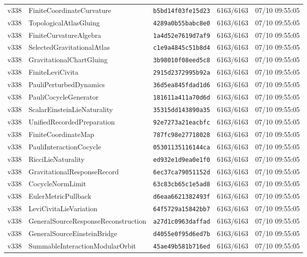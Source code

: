 \documentclass[11pt]{article}
\theoremstyle{definition}\newtheorem{deriv}{Derivação}
\begin{document}
{\begin{longtable}{@{}lllll@{}}
v338 & FiniteCoordinateCurvature & \texttt{b5bd14f03fe15d23} & 6163/6163 & 07/10 09:55:05 \\
v338 & TopologicalAtlasGluing & \texttt{4289a0b55babc8e0} & 6163/6163 & 07/10 09:55:05 \\
v338 & FiniteCurvatureAlgebra & \texttt{1a4d52e7619d7af9} & 6163/6163 & 07/10 09:55:05 \\
v338 & SelectedGravitationalAtlas & \texttt{c1e9a4845c51b8d4} & 6163/6163 & 07/10 09:55:05 \\
v338 & GravitationalChartGluing & \texttt{3b98010f08eed5c8} & 6163/6163 & 07/10 09:55:05 \\
v338 & FiniteLeviCivita & \texttt{2915d2372995b92a} & 6163/6163 & 07/10 09:55:05 \\
v338 & PauliPerturbedDynamics & \texttt{36d5ea845fdad1d6} & 6163/6163 & 07/10 09:55:05 \\
v338 & PauliCocycleGenerator & \texttt{181611a411a70d6d} & 6163/6163 & 07/10 09:55:05 \\
v338 & ScalarEinsteinLieNaturality & \texttt{35315dd143890a35} & 6163/6163 & 07/10 09:55:05 \\
v338 & UnifiedRecordedPreparation & \texttt{92e7273a21eacbfc} & 6163/6163 & 07/10 09:55:05 \\
v338 & FiniteCoordinateMap & \texttt{787fc98e27718028} & 6163/6163 & 07/10 09:55:05 \\
v338 & PauliInteractionCocycle & \texttt{05301135116144ca} & 6163/6163 & 07/10 09:55:05 \\
v338 & RicciLieNaturality & \texttt{ed932e1d9ea0e1f0} & 6163/6163 & 07/10 09:55:05 \\
v338 & GravitationalResponseRecord & \texttt{6ec37ca79051152d} & 6163/6163 & 07/10 09:55:05 \\
v338 & CocycleNormLimit & \texttt{63c83cb65c1e5ad8} & 6163/6163 & 07/10 09:55:05 \\
v338 & EulerMetricPullback & \texttt{d6eaa6621382493f} & 6163/6163 & 07/10 09:55:05 \\
v338 & LeviCivitaLieVariation & \texttt{64f5729a15842bb7} & 6163/6163 & 07/10 09:55:05 \\
v338 & GeneralSourceResponseReconstruction & \texttt{a27d1c0963daffad} & 6163/6163 & 07/10 09:55:05 \\
v338 & GeneralSourceEinsteinBridge & \texttt{d4055e0f95d6ed7b} & 6163/6163 & 07/10 09:55:05 \\
v338 & SummableInteractionModularOrbit & \texttt{45ae49b581b716ed} & 6163/6163 & 07/10 09:55:05 \\

\end{longtable}}
\end{document}
